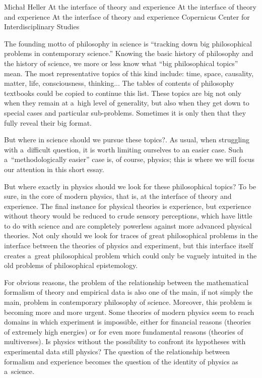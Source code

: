 \begin{editorialeng}{Michał Heller}
	{At the interface of theory and experience}
	{At the interface of theory and experience}
	{At the interface of theory and experience}
	{Copernicus Center for Interdisciplinary Studies}



\lettrine[loversize=0.13,lines=2,lraise=-0.03,nindent=0em,findent=0.2pt]%
{T}{}he founding motto of philosophy in science is ``tracking down big philosophical problems in contemporary science.'' Knowing the basic history of philosophy and the history of science, we more or less know what ``big philosophical topics'' mean. The most representative topics of this kind include: time, space, causality, matter, life, consciousness, thinking... The tables of contents of philosophy textbooks could be copied to continue this list. These topics are big not only when they remain at a~high level of generality, but also when they get down to special cases and particular sub-problems. Sometimes it is only then that they fully reveal their big format.

But where in science should we pursue these topics?. As usual, when struggling with a~difficult question, it is worth limiting ourselves to an easier case. Such a~``methodologically easier'' case is, of course, physics; this is where we will focus our attention in this short essay.

But where exactly in physics should we look for these philosophical topics? To be sure, in the core of modern physics, that is, at the interface of theory and experience. The final instance for physical theories is experience, but experience without theory would be reduced to crude sensory perceptions, which have little to do with science and are completely powerless against more advanced physical theories. Not only should we look for traces of great philosophical problems in the interface between the theories of physics and experiment, but this interface itself creates a~great philosophical problem which could only be vaguely intuited in the old problems of philosophical epistemology.

For obvious reasons, the problem of the relationship between the mathematical formalism of theory and empirical data is also one of the main, if not simply the main, problem in contemporary philosophy of science. Moreover, this problem is becoming more and more urgent. Some theories of modern physics seem to reach domains in which experiment is impossible, either for financial reasons (theories of extremely high energies) or for even more fundamental reasons (theories of multiverses). Is physics without the possibility to confront its hypotheses with experimental data still physics? The question of the relationship between formalism and experience becomes the question of the identity of physics as a~science.


\end{editorialeng}
